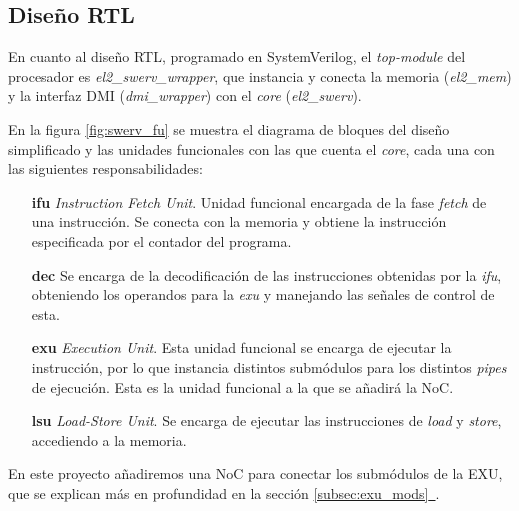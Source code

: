 \subsection{Diseño RTL}

En cuanto al diseño RTL, programado en SystemVerilog, el \textit{top-module} del procesador es \textit{el2\_swerv\_wrapper}, que instancia y conecta la memoria (\textit{el2\_mem}) y la interfaz DMI (\textit{dmi\_wrapper}) con el \textit{core} (\textit{el2\_swerv}).

En la figura \ref{fig:swerv_fu} se muestra el diagrama de bloques del diseño simplificado y las unidades funcionales con las que cuenta el \textit{core}, cada una con las siguientes responsabilidades:

\begin{itemize}[noitemsep]
    \item [\textbf{ifu}] \textit{Instruction Fetch Unit}. Unidad funcional encargada de la fase \textit{fetch} de una instrucción. Se conecta con la memoria y obtiene la instrucción especificada por el contador del programa.
    \item [\textbf{dec}] Se encarga de la decodificación de las instrucciones obtenidas por la \textit{ifu}, obteniendo los operandos para la \textit{exu} y manejando las señales de control de esta.
    \item [\textbf{exu}] \textit{Execution Unit}. Esta unidad funcional se encarga de ejecutar la instrucción, por lo que instancia distintos submódulos para los distintos \textit{pipes} de ejecución. Esta es la unidad funcional a la que se añadirá la NoC.
    \item [\textbf{lsu}] \textit{Load-Store Unit}. Se encarga de ejecutar las instrucciones de \textit{load} y \textit{store}, accediendo a la memoria.
\end{itemize}

En este proyecto añadiremos una NoC para conectar los submódulos de la EXU, que se explican más en profundidad en la sección \hyperref[subsec:exu_mods]{\ref{subsec:exu_mods}~}.

